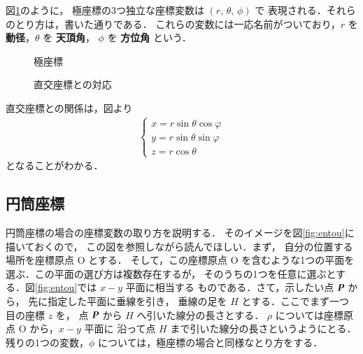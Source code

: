            図\ref{fig:kyoku2}のように，
            極座標の3つ独立な座標変数は $(r,\,\theta,\,\phi)$ で
            表現される．それらのとり方は，書いた通りである．
            これらの変数には一応名前がついており，$r$ を \textbf{動径}，$\theta$ を \textbf{天頂角}，
            $\phi$ を \textbf{方位角} という．
                    \begin{figure}[hbt]
                        \begin{center}
                            \caption{極座標}
                            \label{fig:kyoku2}
                        \end{center}
                    \end{figure}
                    \begin{figure}[hbt]
                        \begin{center}
                            \caption{直交座標との対応}
                            \label{fig:kyoku_chokkou}
                        \end{center}
                    \end{figure}


            直交座標との関係は，図より
                    \begin{align}
                            \begin{cases}\label{kyoku_chokkou}
                                x=r\sin\theta \cos\varphi \\
                                y=r\sin\theta \sin\varphi \\
                                z=r\cos\theta
                            \end{cases}
                    \end{align}
            となることがわかる．



\subsection{円筒座標}
            円筒座標の場合の座標変数の取り方を説明する．
            そのイメージを図\ref{fig:entou}に描いておくので，
            この図を参照しながら読んでほしい．まず，
            自分の位置する場所を座標原点 O とする．
            そして，この座標原点 O を含むような1つの平面を
            選ぶ．この平面の選び方は複数存在するが，
            そのうちの1つを任意に選ぶとする．図\ref{fig:entou}では $x-y$ 平面に相当する
            ものである．さて，示したい点 $\textit{\textbf{P}}$ から，
            先に指定した平面に垂線を引き，
            垂線の足を $H$ とする．ここでまず一つ目の座標 $z$ を，
            点 $\textit{\textbf{P}}$ から $H$ へ引いた線分の長さとする．
             $\rho$ については座標原点 O から，$x-y$ 平面に
            沿って点 $H$ まで引いた線分の長さというようにとる．
            残りの1つの変数，$\phi$ については，極座標の場合と同様なとり方をする．

